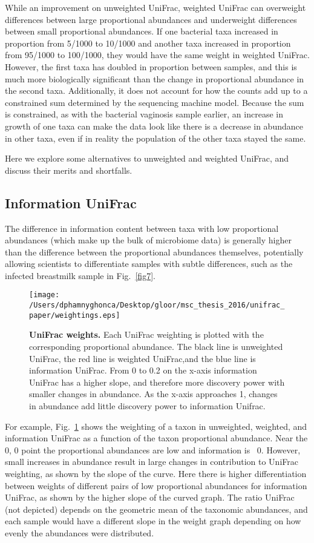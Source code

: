 \documentclass[10pt,letterpaper]{article}
\begin{document}
While an improvement on unweighted UniFrac, weighted UniFrac can overweight differences between large proportional abundances and underweight differences between small proportional abundances. If one bacterial taxa increased in proportion from 5/1000 to 10/1000 and another taxa increased in proportion from 95/1000 to 100/1000, they would have the same weight in weighted UniFrac. However, the first taxa has doubled in proportion between samples, and this is much more biologically significant than the change in proportional abundance in the second taxa. Additionally, it does not account for how the counts add up to a constrained sum determined by the sequencing machine model. Because the sum is constrained, as with the bacterial vaginosis sample earlier, an increase in growth of one taxa can make the data look like there is a decrease in abundance in other taxa, even if in reality the population of the other taxa stayed the same.

Here we explore some alternatives to unweighted and weighted UniFrac, and discuss their merits and shortfalls.

\FloatBarrier

\subsection{Information UniFrac}

The difference in information content between taxa with low proportional abundances (which make up the bulk of microbiome data) is generally higher than the difference between the proportional abundances themselves, potentially allowing scientists to differentiate samples with subtle differences, such as the infected breastmilk sample in Fig.~\ref{fig7}.

\begin{figure}[h]
\texttt{[image: /Users/dphamnyghonca/Desktop/gloor/msc\_thesis\_2016/unifrac\_paper/weightings.eps]}
\caption[UniFrac weights.]{{\bf UniFrac weights. }
Each UniFrac weighting is plotted with the corresponding proportional abundance. The black line is unweighted UniFrac, the red line is weighted UniFrac,and  the blue line is information UniFrac. From 0 to 0.2 on the x-axis information UniFrac has a higher slope, and therefore more discovery power with smaller changes in abundance. As the x-axis approaches 1, changes in abundance add little discovery power to information Unifrac.}
\label{fig5}
\end{figure}

For example, Fig.~\ref{fig5} shows the weighting of a taxon in unweighted, weighted, and information UniFrac as a function of the taxon proportional abundance. Near the 0, 0 point the proportional abundances are low and information is ~0. However, small increases in abundance result in large changes in contribution to UniFrac weighting, as shown by the slope of the curve. Here there is higher differentiation between weights of different pairs of low proportional abundances for information UniFrac, as shown by the higher slope of the curved graph. The ratio UniFrac (not depicted) depends on the geometric mean of the taxonomic abundances, and each sample would have a different slope in the weight graph depending on how evenly the abundances were distributed.
\end{document}

